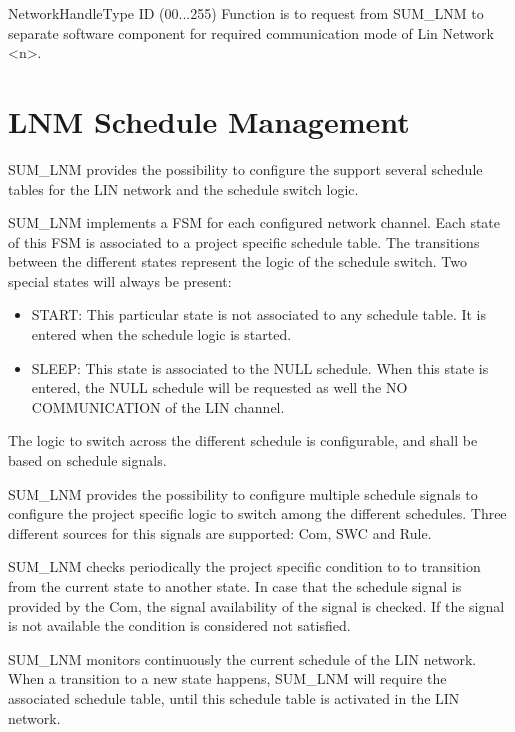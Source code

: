 {
{NetworkHandleType ID (00...255)}
{}
{}
{}
{Function is to request from SUM_LNM to separate software component for required communication mode of Lin Network <n>.}
}
{}

\section{LNM Schedule Management}
\label{sec:lnm_schedule_management}

SUM_LNM provides the possibility to configure the support several schedule tables for the LIN network and the schedule switch logic.

{
SUM_LNM implements a FSM for each configured network channel. Each state of this FSM is associated to a project specific schedule table. The transitions between the different states represent the logic of 
the schedule switch. 
Two special states will always be present:
\begin{itemize}
    \item START: This particular state is not associated to any schedule table. It is entered when the schedule logic is started.
	\item SLEEP: This state is associated to the NULL schedule. When this state is entered, the NULL schedule will be requested as well the NO COMMUNICATION of the LIN channel.
\end{itemize}
The logic to switch across the different schedule is configurable, and shall be based on schedule signals.
}
{  }

{
SUM_LNM provides the possibility to configure multiple schedule signals to configure the project specific logic to switch among the different schedules.
Three different sources for this signals are supported: Com, SWC and Rule.
}
{ }

{
SUM_LNM checks periodically the project specific condition to to transition from the current state to another state. In case that the schedule signal is provided by the Com, the signal availability of the
signal is checked. If the signal is not available the condition is considered not satisfied.
}
{}

{
SUM_LNM monitors continuously the current schedule of the LIN network. When a transition to a new state happens, SUM_LNM will require the associated schedule table, until this schedule table is activated in the LIN network.
}
{ }

